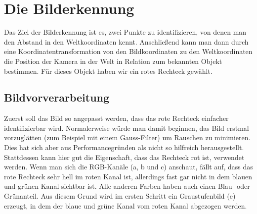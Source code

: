 \section{Die Bilderkennung}

Das Ziel der Bilderkennung ist es, zwei Punkte zu identifizieren, von denen man den Abstand in den Weltkoordinaten kennt. Anschließend kann man dann durch eine Koordinatentransformation von den Bildkoordinaten zu den Weltkoordinaten die Position der Kamera in der Welt in Relation zum bekannten Objekt bestimmen. Für dieses Objekt haben wir ein rotes Rechteck gewählt.

\subsection{Bildvorverarbeitung}

Zuerst soll das Bild so angepasst werden, dass das rote Rechteck einfacher identifizierbar wird. 
Normalerweise würde man damit beginnen, das Bild erstmal vorzuglätten (zum Beispiel mit einem Gauss-Filter) um Rauschen zu minimieren. Dies hat sich aber aus Performancegründen als nicht so hilfreich herausgestellt. Stattdessen kann hier gut die Eigenschaft, dass das Rechteck rot ist, verwendet werden. Wenn man sich die RGB-Kanäle (a, b und c) anschaut, fällt auf, dass das rote Rechteck sehr hell im roten Kanal ist, allerdings fast gar nicht in dem blauen und grünen Kanal sichtbar ist. Alle anderen Farben haben auch einen Blau- oder Grünanteil. Aus diesem Grund wird im ersten Schritt ein Graustufenbild (e) erzeugt, in dem der blaue und grüne Kanal vom roten Kanal abgezogen werden.

